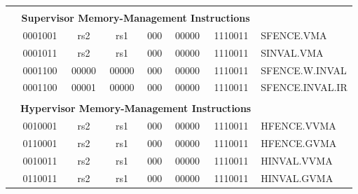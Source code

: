 \begin{table}[p]
\begin{small}
\begin{center}
\begin{tabular}{p{0in}p{0.4in}p{0.05in}p{0.05in}p{0.05in}p{0.05in}p{0.4in}p{0.6in}p{0.4in}p{0.6in}p{0.7in}l}
&
\multicolumn{10}{c}{} & \\
&
\multicolumn{10}{c}{\bf Supervisor Memory-Management Instructions} & \\
\cline{2-11}
  

&
\multicolumn{4}{|c|}{0001001} &
\multicolumn{2}{c|}{rs2} &
\multicolumn{1}{c|}{rs1} &
\multicolumn{1}{c|}{000} &
\multicolumn{1}{c|}{00000} &
\multicolumn{1}{c|}{1110011} & SFENCE.VMA \\
\cline{2-11}
  

&
\multicolumn{4}{|c|}{0001011} &
\multicolumn{2}{c|}{rs2} &
\multicolumn{1}{c|}{rs1} &
\multicolumn{1}{c|}{000} &
\multicolumn{1}{c|}{00000} &
\multicolumn{1}{c|}{1110011} & SINVAL.VMA \\
\cline{2-11}
  

&
\multicolumn{4}{|c|}{0001100} &
\multicolumn{2}{c|}{00000} &
\multicolumn{1}{c|}{00000} &
\multicolumn{1}{c|}{000} &
\multicolumn{1}{c|}{00000} &
\multicolumn{1}{c|}{1110011} & SFENCE.W.INVAL \\
\cline{2-11}
  

&
\multicolumn{4}{|c|}{0001100} &
\multicolumn{2}{c|}{00001} &
\multicolumn{1}{c|}{00000} &
\multicolumn{1}{c|}{000} &
\multicolumn{1}{c|}{00000} &
\multicolumn{1}{c|}{1110011} & SFENCE.INVAL.IR \\
\cline{2-11}
  

&
\multicolumn{10}{c}{} & \\
&
\multicolumn{10}{c}{\bf Hypervisor Memory-Management Instructions} & \\
\cline{2-11}
  

&
\multicolumn{4}{|c|}{0010001} &
\multicolumn{2}{c|}{rs2} &
\multicolumn{1}{c|}{rs1} &
\multicolumn{1}{c|}{000} &
\multicolumn{1}{c|}{00000} &
\multicolumn{1}{c|}{1110011} & HFENCE.VVMA \\
\cline{2-11}
  

&
\multicolumn{4}{|c|}{0110001} &
\multicolumn{2}{c|}{rs2} &
\multicolumn{1}{c|}{rs1} &
\multicolumn{1}{c|}{000} &
\multicolumn{1}{c|}{00000} &
\multicolumn{1}{c|}{1110011} & HFENCE.GVMA \\
\cline{2-11}
  

&
\multicolumn{4}{|c|}{0010011} &
\multicolumn{2}{c|}{rs2} &
\multicolumn{1}{c|}{rs1} &
\multicolumn{1}{c|}{000} &
\multicolumn{1}{c|}{00000} &
\multicolumn{1}{c|}{1110011} & HINVAL.VVMA \\
\cline{2-11}
  

&
\multicolumn{4}{|c|}{0110011} &
\multicolumn{2}{c|}{rs2} &
\multicolumn{1}{c|}{rs1} &
\multicolumn{1}{c|}{000} &
\multicolumn{1}{c|}{00000} &
\multicolumn{1}{c|}{1110011} & HINVAL.GVMA \\
\cline{2-11}
  


\end{tabular}
\end{center}
\end{small}
\end{table}
